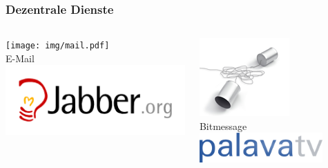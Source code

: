 \documentclass[12pt]{beamer}
\begin{document}
\begin{frame}
  \frametitle{Dezentrale Dienste}
    \begin{columns}
        \begin{column}{5cm}
            \begin{center}
                \texttt{[image: img/mail.pdf]} \\
                E-Mail \\
                \vspace{1cm}
                \includegraphics[height=0.2\textheight]{img/jabber.png}
            \end{center}
        \end{column}
        \begin{column}{5cm}
            \begin{center}
                \includegraphics[height=0.2\textheight]{img/bitmessagelogo.png} \\
                Bitmessage \\
                \vspace{1cm}
                \includegraphics[width=0.8\textwidth]{img/palava-tv.png}
            \end{center}
        \end{column}
    \end{columns}
\end{frame}
\end{document}
